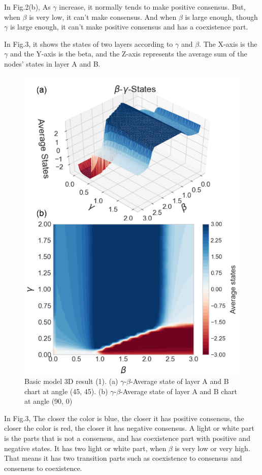 \documentclass[english]{cccconf}
\begin{document}
In Fig.2(b), As $\gamma$ increase, it normally tends to make positive consensus. But, when $\beta$ is very low, it can’t make consensus. And when $\beta$ is large enough, though $\gamma$ is large enough, it can’t make positive consensus and has a coexistence part.

In Fig.3, it shows the states of two layers according to $\gamma$ and $\beta$. The X-axis is the $\gamma$ and the Y-axis is the beta, and the Z-axis represents the average sum of the nodes' states in layer A and B. 

\begin{figure}[!htb]
  \centering
  \includegraphics[width=\hsize]{FIG3.png}
  \caption{Basic model 3D result (1). (a) $\gamma$-$\beta$-Average state of layer A and B chart at angle (45, 45). (b) $\gamma$-$\beta$-Average state of layer A and B chart at angle (90, 0)}
  \label{Fig3}
\end{figure}
In Fig.3, The closer the color is blue, the closer it has positive consensus, the closer the color is red, the closer it has negative consensus. A light or white part is the parts that is not a consensus, and has coexistence part with positive and negative states. It has two light or white part, when $\beta$ is very low or very high. That means it has two transition parts such as coexistence to consensus and consensus to coexistence. 
\end{document}

